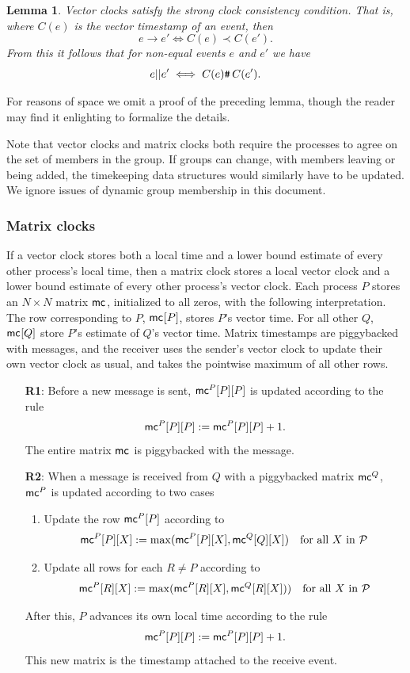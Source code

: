\documentclass[]             %
{NASA}                       %
\newtheorem{lemma}[theorem]{Lemma}
\theoremstyle{definition}
\begin{document}
\begin{lemma}
  Vector clocks satisfy the strong clock consistency condition. That
  is, where $C(e)$ is the vector timestamp of an event, then
  \[ e \to e' \iff C(e) \prec C(e'). \]
  From this it follows that for non-equal events $e$ and $e'$ we have
  \[e || e' \iff {C(e) \texttt{\#}\,C(e')}. \]%
\end{lemma}

For reasons of space we omit a proof of the preceding lemma, though
the reader may find it enlighting to formalize the details.

Note that vector clocks and matrix clocks both require the processes
to agree on the set of members in the group. If groups can change,
with members leaving or being added, the timekeeping data structures
would similarly have to be updated. We ignore issues of dynamic group
membership in this document.

\subsubsection{Matrix clocks}
\label{sssec:matrix-clocks}
If a vector clock stores both a local time and a lower bound estimate
of every other process's local time, then a matrix clock stores a
local vector clock and a lower bound estimate of every other process's
vector clock. Each process $P$ stores an $N\times{}N$ matrix
$\mathsf{mc}^{}{}{}$, initialized to all zeros, with the following
interpretation. The row corresponding to $P$, $\mathsf{mc}^{}{[P]}{}$,
stores $P$'s vector time. For all other $Q$, $\mathsf{mc}^{}{[Q]}{}$ store $P$'s
estimate of $Q$'s vector time. Matrix timestamps are piggybacked
with messages, and the receiver uses the sender's vector clock to
update their own vector clock as usual, and takes the pointwise
maximum of all other rows.

\begin{enumerate}
\item[\textbf{R1}:] Before a new message is sent, $\mathsf{mc}^{P}{[P]}{[P]}$ is updated according to the rule
  \[\mathsf{mc}^{P}{[P]}{[P]} := \mathsf{mc}^{P}{[P]}{[P]} + 1.\]
  The entire matrix $\mathsf{mc}^{}{}{}$ is piggybacked with the message.
\item[\textbf{R2}:] When a message is received from $Q$ with a piggybacked matrix $\mathsf{mc}^{Q}{}{}$,
  $\mathsf{mc}^{P}{}{}$ is updated according to two cases
  \begin{enumerate}
  \item Update the row $\mathsf{mc}^{P}{[P]}{}$ according to
    \[\mathsf{mc}^{P}{[P]}{[X]}:= \max( \mathsf{mc}^{P}{[P]}{[X]} ,  \mathsf{mc}^{Q}{[Q]}{[X]}) \quad \textrm{for all $X$ in $\mathcal{P}$}\]
  \item Update all rows for each $R \neq P$ according to
    \[\mathsf{mc}^{P}{[R]}{[X]} := \max(\mathsf{mc}^{P}{[R]}{[X]} ,  \mathsf{mc}^{Q}{[R]}{[X]})) \quad \textrm{for all $X$ in $\mathcal{P}$}\]
  \end{enumerate}
  After this, $P$ advances its own local time according to the rule
  \[ \mathsf{mc}^{P}{[P]}{[P]} := \mathsf{mc}^{P}{[P]}{[P]} + 1.\]
  This new matrix is the timestamp attached to the receive event.
\end{enumerate}
\end{document}
